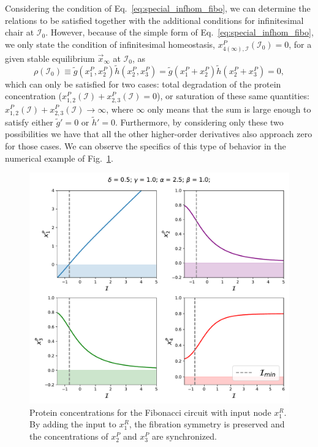 Considering the condition of Eq.~\ref{eq:special_infhom_fibo}, we can determine the relations 
to be satisfied together with the additional conditions for infinitesimal chair at $\mathcal{I}_0$. 
However, because of the simple form of Eq.~\ref{eq:special_infhom_fibo},
we only state the condition of infinitesimal homeostasis, $x_{4(\infty), \mathcal{I}}^P(\mathcal{I}_0) = 0$, 
for a given stable equilibrium $\vec{x}_{\infty}$ at $\mathcal{I}_0$, as
\begin{equation}
    \rho(\mathcal{I}_0) \equiv \tilde{g}(x_1^P, x_2^P)\tilde{h}(x_2^P,x_3^P) = \tilde{g}(x_1^P +  x_2^P)\tilde{h}(x_2^P + x_3^P) = 0, 
\end{equation}
which can only be satisfied for two cases: total degradation of the protein concentration
($x_{1,2}^P(\mathcal{I}) +  x_{2,3}^P(\mathcal{I}) = 0$), or saturation 
of these same quantities: $x_{1,2}^P(\mathcal{I}) +  x_{2,3}^P(\mathcal{I}) \rightarrow \infty$, 
where $\infty$ only means that the sum is large enough to satisfy either 
$\tilde{g}' = 0$ or $\tilde{h}' = 0$. Furthermore, by considering only these two possibilities
we have that all the other higher-order derivatives also approach zero for those cases. We can 
observe the specifics of this type of behavior in the numerical example of Fig.~\ref{fig:fibo_x1r_ex1}.



\begin{figure}[H]
    \centering
    \includegraphics[scale=0.52]{figs/numerics/fibo_x1r_ex1.pdf}
    \caption{Protein concentrations for the Fibonacci circuit with input node $x_1^R$.
    By adding the input to $x_1^R$, the fibration symmetry is preserved and the concentrations
    of $x_2^P$ and $x_3^P$ are synchronized.}
    \label{fig:fibo_x1r_ex1}
\end{figure}

